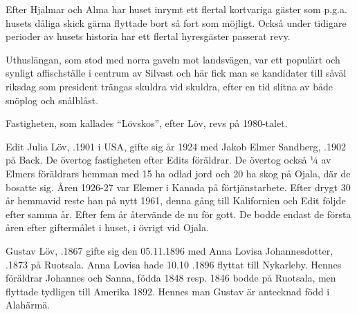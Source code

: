 Efter Hjalmar och Alma har huset inrymt ett flertal kortvariga gäster som p.g.a. husets dåliga skick gärna flyttade bort så fort som möjligt. Också under tidigare perioder av husets historia har ett flertal hyresgäster passerat revy.

Uthuslängan, som stod med norra gaveln mot landsvägen, var ett populärt och synligt affischställe i centrum av Silvast och här fick man se kandidater till såväl riksdag som president trängas skuldra vid skuldra, efter en tid slitna av både snöplog och snålblåst.

Fastigheten, som kallades ``Lövskos'', efter Löv, revs på 1980-talet.


%
Edit Julia Löv, .1901 i USA, gifte sig år 1924 med Jakob Elmer Sandberg, .1902 på Back. De övertog fastigheten efter Edits föräldrar. De övertog också ¼ av Elmers föräldrars hemman med 15 ha odlad jord och 20 ha skog på Ojala, där de bosatte sig. Åren 1926-27 var Elemer i Kanada på förtjänstarbete. Efter drygt 30 år hemmavid reste han på nytt 1961, denna gång till Kalifornien och Edit följde efter samma år. Efter fem år återvände de nu för gott. De bodde endast de första åren efter giftermålet i huset, i övrigt vid Ojala.
\begin{jhchildren}
  \item {}
  \item {}
  \item {}
\end{jhchildren}


%
Gustav Löv, .1867 gifte sig den 05.11.1896 med Anna Lovisa Johannesdotter, .1873 på Ruotsala. Anna Lovisa hade 10.10 .1896 flyttat till Nykarleby. Hennes föräldrar Johannes och Sanna, födda 1848 resp. 1846 bodde på Ruotsala, men flyttade tydligen till Amerika 1892. Hennes man Gustav är antecknad född i Alahärmä.
\begin{jhchildren}
  \item {}
  \item {}
  \item {}
  \item {}
\end{jhchildren}


